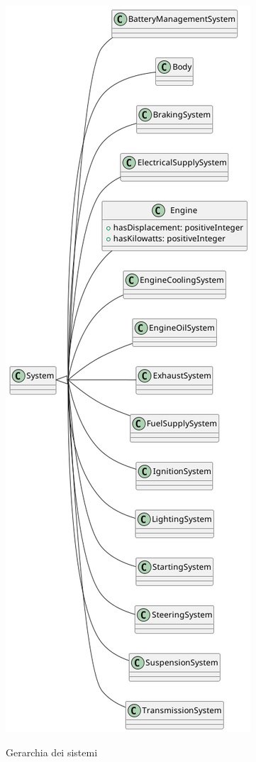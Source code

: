 \begin{figure}
    \caption{Gerarchia dei sistemi}
    \includegraphics[height=\textheight]{figures/carpedia-system.png}
    \label{fig:carpedia-system}
\end{figure}

